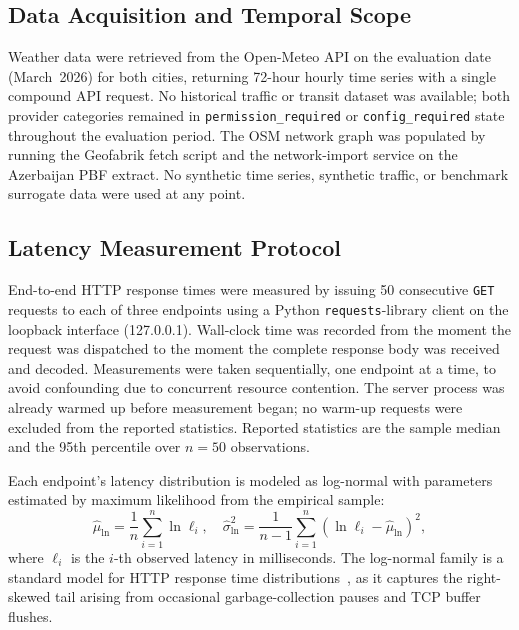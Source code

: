 \subsection{Data Acquisition and Temporal Scope}

Weather data were retrieved from the Open-Meteo API on the evaluation date
(March~2026) for both cities, returning 72-hour hourly time series with a
single compound API request.
No historical traffic or transit dataset was available; both provider
categories remained in \texttt{permission\_required} or
\texttt{config\_required} state throughout the evaluation period.
The OSM network graph was populated by running the Geofabrik fetch script
and the network-import service on the Azerbaijan PBF extract.
No synthetic time series, synthetic traffic, or benchmark surrogate data
were used at any point.

\subsection{Latency Measurement Protocol}

End-to-end HTTP response times were measured by issuing 50 consecutive
\texttt{GET} requests to each of three endpoints using a Python
\texttt{requests}-library client on the loopback interface (127.0.0.1).
Wall-clock time was recorded from the moment the request was dispatched
to the moment the complete response body was received and decoded.
Measurements were taken sequentially, one endpoint at a time, to avoid
confounding due to concurrent resource contention.
The server process was already warmed up before measurement began; no
warm-up requests were excluded from the reported statistics.
Reported statistics are the sample median and the 95th percentile over
$n = 50$ observations.

Each endpoint's latency distribution is modeled as log-normal with
parameters estimated by maximum likelihood from the empirical sample:
\begin{equation}
  \hat{\mu}_{\ln} = \frac{1}{n}\sum_{i=1}^{n} \ln \ell_i,
  \quad
  \hat{\sigma}_{\ln}^2 = \frac{1}{n-1}\sum_{i=1}^{n}
    (\ln \ell_i - \hat{\mu}_{\ln})^2,
  \label{eq:lognormal_mle}
\end{equation}
where $\ell_i$ is the $i$-th observed latency in milliseconds.
The log-normal family is a standard model for HTTP response time
distributions~\cite{latency_lognormal}, as it captures the right-skewed
tail arising from occasional garbage-collection pauses and TCP buffer
flushes.

